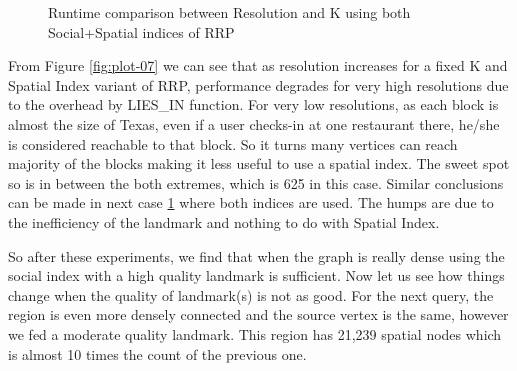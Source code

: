 \begin{figure*}[t]
\begin{subfigure}[t]{0.5\textwidth}
		\caption{Runtime comparison between Resolution and K using both Social+Spatial indices of RRP}
		\label{fig:plot-08}
	\end{subfigure}
	\caption{Runtime comparison between Resolution and K for different types of RRP algorithms}
\end{figure*}

From Figure \ref{fig:plot-07} we can see that as resolution increases for a fixed K and Spatial Index variant of RRP, performance degrades for very high resolutions due to the overhead by LIES\_IN function. For very low resolutions, as each block is almost the size of Texas, even if a user checks-in at one restaurant there, he/she is considered reachable to that block. So it turns many vertices can reach majority of the blocks making it less useful to use a spatial index. The sweet spot so is in between the both extremes, which is 625 in this case. Similar conclusions can be made in next case \ref {fig:plot-08} where both indices are used. The humps are due to the inefficiency of the landmark and nothing to do with Spatial Index.

So after these experiments, we find that when the graph is really dense using the social index with a high quality landmark is sufficient. Now let us see how things change when the quality of landmark(s) is not as good. For the next query, the region is even more densely connected and the source vertex is the same, however we fed a moderate quality landmark. This region has 21,239 spatial nodes which is almost 10 times the count of the previous one.


